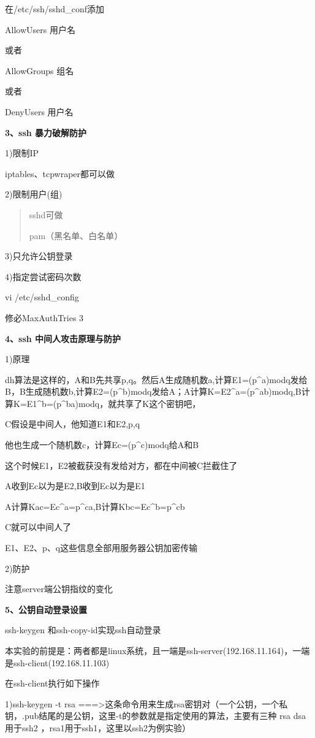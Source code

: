 \documentclass[letterpaper,10pt]{sphinxmanual}
\begin{document}
在/etc/ssh/sshd\_conf添加

AllowUsers 用户名

或者

AllowGroups 组名

或者

DenyUsers 用户名

\textbf{3、ssh 暴力破解防护}

1)限制IP

iptables、tcpwraper都可以做

2)限制用户(组)
\begin{quote}

sshd可做

pam（黑名单、白名单）
\end{quote}

3)只允许公钥登录

4)指定尝试密码次数

vi /etc/sshd\_config

修必MaxAuthTries 3

\textbf{4、ssh 中间人攻击原理与防护}

1)原理

dh算法是这样的，A和B先共享p,q。然后A生成随机数a,计算E1=(p\textasciicircum{}a)modq发给B，B生成随机数b,计算E2=(p\textasciicircum{}b)modq发给A；A计算K=E2\textasciicircum{}a=(p\textasciicircum{}ab)modq,B计算K=E1\textasciicircum{}b=(p\textasciicircum{}ba)modq，就共享了K这个密钥吧，

C假设是中间人，他知道E1和E2,p,q

他也生成一个随机数c，计算Ec=(p\textasciicircum{}c)modq给A和B

这个时候E1，E2被截获没有发给对方，都在中间被C拦截住了

A收到Ec以为是E2,B收到Ec以为是E1

A计算Kac=Ec\textasciicircum{}a=p\textasciicircum{}ca,B计算Kbc=Ec\textasciicircum{}b=p\textasciicircum{}cb

C就可以中间人了

E1、E2、p、q这些信息全部用服务器公钥加密传输

2)防护

注意server端公钥指纹的变化

\textbf{5、公钥自动登录设置}

ssh-keygen 和ssh-copy-id实现ssh自动登录

本实验的前提是：两者都是linux系统，且一端是ssh-server(192.168.11.164)，一端是ssh-client(192.168.11.103)

在ssh-client执行如下操作

1)ssh-keygen -t rsa   ===\textgreater{}这条命令用来生成rsa密钥对（一个公钥，一个私钥，.pub结尾的是公钥，这里-t的参数就是指定使用的算法，主要有三种 rsa dsa 用于ssh2 ，rsa1用于ssh1，这里以ssh2为例实验）
\end{document}
